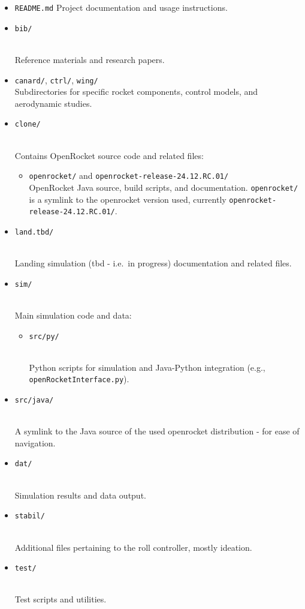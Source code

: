 \documentclass{amsdtx}
\providecommand{\tightlist}{%
  \setlength{\itemsep}{0pt}\setlength{\parskip}{0pt}}
\begin{document}
{\begin{itemize}
\item
  \texttt{README.md} Project documentation and usage instructions.
\item
  \texttt{bib/}\strut \\
  Reference materials and research papers.
\item
  \texttt{canard/}, \texttt{ctrl/}, \texttt{wing/}\\
  Subdirectories for specific rocket components, control models, and
  aerodynamic studies.
\item
  \texttt{clone/}\strut \\
  Contains OpenRocket source code and related files:

  \begin{itemize}
  \tightlist
  \item
    \texttt{openrocket/} and \texttt{openrocket-release-24.12.RC.01/}\\
    OpenRocket Java source, build scripts, and documentation.
    \texttt{openrocket/} is a symlink to the openrocket version used,
    currently \texttt{openrocket-release-24.12.RC.01/}.
  \end{itemize}
\item
  \texttt{land.tbd/}\strut \\
  Landing simulation (tbd - i.e.~in progress) documentation and related
  files.
\item
  \texttt{sim/}\strut \\
  Main simulation code and data:

  \begin{itemize}
  \tightlist
  \item
    \texttt{src/py/}\strut \\
    Python scripts for simulation and Java-Python integration (e.g.,
    \texttt{openRocketInterface.py}).
  \end{itemize}
\item
  \texttt{src/java/}\strut \\
  A symlink to the Java source of the used openrocket distribution - for
  ease of navigation.
\item
  \texttt{dat/}\strut \\
  Simulation results and data output.
\item
  \texttt{stabil/}\strut \\
  Additional files pertaining to the roll controller, mostly ideation.
\item
  \texttt{test/}\strut \\
  Test scripts and utilities.
\end{itemize}

}
\end{document}
